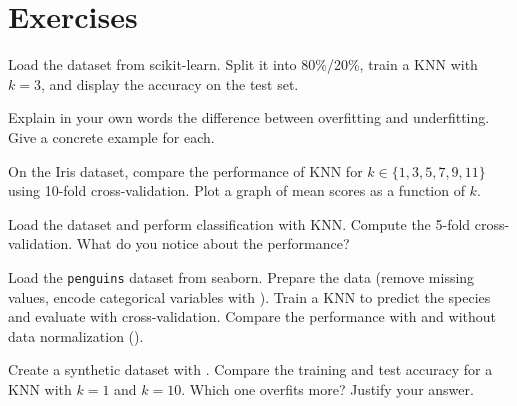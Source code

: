 \section{Exercises}

\begin{exercise}[$\star$]
Load the  dataset from scikit-learn. Split it into 80\%/20\%, train a KNN with $k=3$, and display the accuracy on the test set.
\end{exercise}

\begin{exercise}[$\star$]
Explain in your own words the difference between overfitting and underfitting. Give a concrete example for each.
\end{exercise}

\begin{exercise}[$\star\star$]
On the Iris dataset, compare the performance of KNN for $k \in \{1, 3, 5, 7, 9, 11\}$ using 10-fold cross-validation. Plot a graph of mean scores as a function of $k$.
\end{exercise}

\begin{exercise}[$\star\star$]
Load the  dataset and perform classification with KNN. Compute the 5-fold cross-validation. What do you notice about the performance?
\end{exercise}

\begin{exercise}[$\star\star\star$]
Load the \texttt{penguins} dataset from seaborn. Prepare the data (remove missing values, encode categorical variables with ). Train a KNN to predict the species and evaluate with cross-validation. Compare the performance with and without data normalization ().
\end{exercise}

\begin{exercise}[$\star\star\star$]
Create a synthetic dataset with . Compare the training and test accuracy for a KNN with $k=1$ and $k=10$. Which one overfits more? Justify your answer.
\end{exercise}


